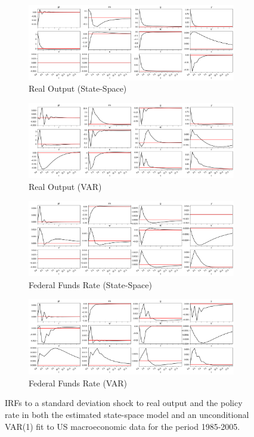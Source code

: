 \documentclass{article}
\begin{document}
\begin{figure}
  \centering
  \begin{subfigure}{0.8\textwidth}
    \includegraphics[width=\linewidth]{images/real_data_y_irf.png}
    \caption{Real Output (State-Space)}
    \label{us_y_irf}
  \end{subfigure}
  \begin{subfigure}{0.8\textwidth}
    \includegraphics[width=\linewidth]{images/real_data_y_var_irf.png}
    \caption{Real Output (VAR)}
    \label{us_y_var_irf}
  \end{subfigure}
  \begin{subfigure}{0.8\textwidth}
    \includegraphics[width=\linewidth]{images/real_data_rm_irf.png}
    \caption{Federal Funds Rate (State-Space)}
    \label{us_rm_irf}
  \end{subfigure}
  \begin{subfigure}{0.8\textwidth}
    \includegraphics[width=\linewidth]{images/real_data_rm_var_irf.png}
    \caption{Federal Funds Rate (VAR)}
    \label{us_rm_var_irf}
  \end{subfigure}

  \caption{IRFs to a standard deviation shock to real output and the policy rate in both the estimated state-space model and an unconditional VAR(1) fit to US macroeconomic data for the period 1985-2005.}
  \label{us_yrm_irfs}
\end{figure}
\end{document}
